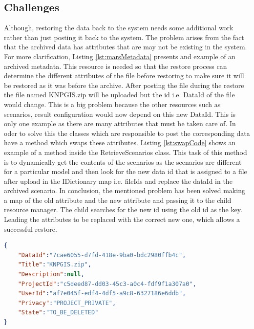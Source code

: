 \subsection{Challenges}
\label{subsec:restoreProb}
Although, restoring the data back to the system needs some additional work rather than just posting it back to the system. The problem
arises from the fact that the archived data has attributes that are may not be existing in the system. For more clarification, Listing \ref{lst:marsMetadata} 
presents and example of an archived metadata. This resource is needed so that the restore process can determine the different attributes of the file
before restoring to make sure it will be restored as it was before the archive. After posting the file during the restore the file named KNPGIS.zip will 
be uploaded but the id i.e. DataId of the file would change. This is a big problem because the other resources such as scenarios, result configuration would now
depend on this new DataId. This is only one example as there are many attributes that must be taken care of. In oder to solve this the classes which are responsible
to post the corresponding data have a method which swaps these attributes. Listing \ref{lst:swapCode} shows an example of a method inside the RetrieveScenarios class.
This task of this method is to dynamically get the contents of the scenarios as the scenarios are different for a particular model and then look for the new data id
that is assigned to a file after upload in the IDictionary map i.e. fileIds and replace the dataId in the archived scenario. In conclusion, the mentioned problem
has been solved making a map of the old attribute and the new attribute and passing it to the child resource manager. The child searches for the new id using the 
old id as the key. Leading the attributes to be replaced with the correct new one, which allows a successful restore.

\par

\begin{lstlisting}[caption={Archived MARS metadata resource}, language=json,firstnumber=1, captionpos=b, label={lst:marsMetadata}]
{
    "DataId":"7cae6055-d7fd-418e-9ba0-bdc2980ffb4c",
    "Title":"KNPGIS.zip",
    "Description":null,
    "ProjectId":"c5deed87-dd03-45c3-a0c4-fdf9f1a307a0",
    "UserId":"af7e045f-edf4-4df5-a9c8-6327186e6ddb",
    "Privacy":"PROJECT_PRIVATE",
    "State":"TO_BE_DELETED"
}
\end{lstlisting}

